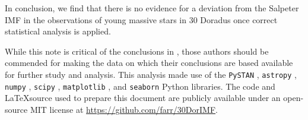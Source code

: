 \documentclass[apjl]{emulateapj}
\begin{document}
In conclusion, we find that there is no evidence for a deviation from the Salpeter IMF in the observations of young massive stars in 30 Doradus once correct statistical analysis is applied.

\acknowledgments

While this note is critical of the conclusions in \citet{Schneider:2018}, those
authors should be commended for making the data on which their conclusions are
based available for further study and analysis.  This analysis made use of the \texttt{PySTAN} \citep{PySTAN}, \texttt{astropy} \citep{astropy}, \texttt{numpy} \citep{numpy}, \texttt{scipy} \citep{scipy}, \texttt{matplotlib} \citep{matplotlib}, and \texttt{seaborn} \citep{seaborn} Python libraries.  The code and \LaTeX source used to prepare this document are publicly available under an open-source MIT license at \url{https://github.com/farr/30DorIMF}.



\end{document}
